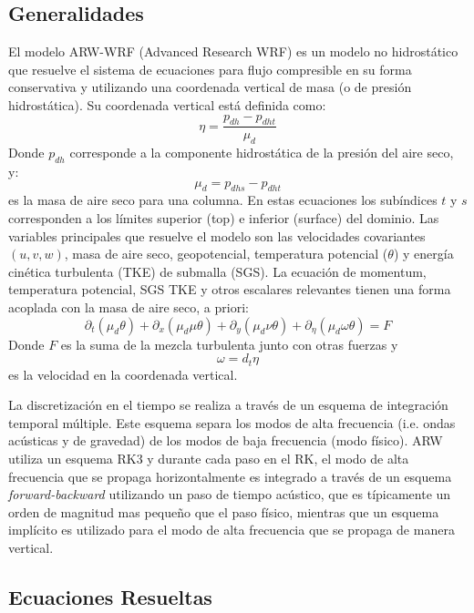 \subsection{Generalidades}
El modelo ARW-WRF (Advanced Research WRF) es un modelo no hidrostático que resuelve el sistema de ecuaciones para flujo compresible en su forma conservativa y utilizando una coordenada vertical de masa (o de presión hidrostática). Su coordenada vertical está definida como:
\begin{equation}
\eta = \frac{p_{dh}-p_{dht}}{\mu_d}
\end{equation}
Donde $p_{dh}$ corresponde a la componente hidrostática de la presión del aire seco, y:
\begin{equation}
\mu_d = p_{dhs} - p_{dht}
\end{equation}
es la masa de aire seco para una columna. En estas ecuaciones los subíndices $t$ y $s$ corresponden a los límites superior (top) e inferior (surface) del dominio. Las variables principales que resuelve el modelo son las velocidades covariantes $(u,v,w)$, masa de aire seco, geopotencial, temperatura potencial ($\theta$) y energía cinética turbulenta (TKE) de submalla (SGS). La ecuación de momentum, temperatura potencial, SGS TKE y otros escalares relevantes tienen una forma acoplada con la masa de aire seco, a priori:
\begin{equation}
\partial_t (\mu_d\theta) + \partial_x(\mu_d\mu\theta)+\partial_y(\mu_d\nu\theta)+\partial_\eta (\mu_d\omega\theta) = F
\end{equation}
Donde $F$ es la suma de la mezcla turbulenta junto con otras fuerzas y
\begin{equation}
\omega = d_t\eta
\end{equation}
es la velocidad en la coordenada vertical.

La discretización en el tiempo se realiza a través de un esquema de integración temporal múltiple. Este esquema separa los modos de alta frecuencia (i.e. ondas acústicas y de gravedad) de los modos de baja frecuencia (modo físico). ARW utiliza un esquema RK3 y durante cada paso en el RK, el modo de alta frecuencia que se propaga horizontalmente es integrado a través de un esquema \emph{forward-backward} utilizando un paso de tiempo acústico, que es típicamente un orden de magnitud mas pequeño que el paso físico, mientras que un esquema implícito es utilizado para el modo de alta frecuencia que se propaga de manera vertical.
\subsection{Ecuaciones Resueltas}
